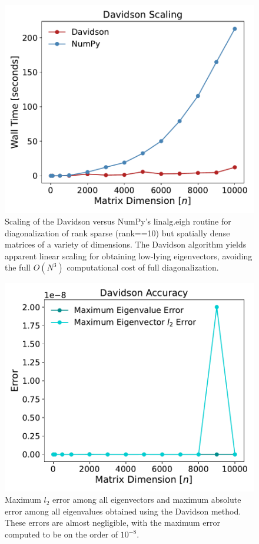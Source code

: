 \documentclass[12pt, fleqn]{article}
\begin{document}
\begin{figure}[ht]
\centering
\includegraphics[width=\textwidth]{./figures/dav_scaling.pdf}
\caption{
Scaling of the Davidson versus NumPy's linalg.eigh routine for diagonalization of rank sparse (\textsf{rank==10}) but spatially dense matrices of a variety of dimensions.
The Davidson algorithm yields apparent linear scaling for obtaining low-lying eigenvectors, avoiding the full $O(N^3)$ computational cost of full diagonalization. 
}
\label{fig:dav-scaling}
\end{figure}


\begin{figure}[ht]
\centering
\includegraphics[width=\textwidth]{./figures/dav_error.pdf}
\caption{
Maximum $l_2$ error among all eigenvectors and maximum absolute error among all eigenvalues obtained using the Davidson method. 
These errors are almost negligible, with the maximum error computed to be on the order of $10^{-8}$. 
}
\label{fig:dav-error}
\end{figure}
\end{document}

